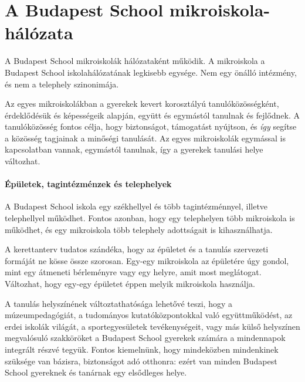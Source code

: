 \section{A Budapest School mikroiskola-hálózata}


A Budapest School mikroiskolák hálózataként működik. A mikroiskola a Budapest
School iskolahálózatának legkisebb egysége. Nem egy önálló intézmény, és nem a
telephely szinonimája.

Az egyes mikroiskolákban a gyerekek kevert korosztályú tanulóközösségként,
érdeklődésük és képességeik alapján, együtt és egymástól tanulnak és fejlődnek.
A tanulóközösség fontos célja, hogy biztonságot, támogatást nyújtson, és
\emph{így} segítse a közösség tagjainak a minőségi tanulását. Az egyes
mikroiskolák egymással is kapcsolatban vannak,
egymástól tanulnak, így a gyerekek tanulási helye változhat.

\paragraph{Épületek, tagintézménzek és telephelyek}
A Budapest School iskola egy székhellyel és több tagintézménnyel, illetve
telephellyel működhet. Fontos azonban, hogy egy telephelyen több mikroiskola is
működhet, és egy mikroiskola több telephely adottságait is kihasználhatja.

A kerettanterv tudatos szándéka, hogy az épületet és a
tanulás szervezeti formáját ne kösse össze szorosan. Egy-egy mikroiskola az
épületére úgy gondol, mint egy átmeneti bérleményre vagy egy helyre, amit most
meglátogat.
Változhat, hogy egy-egy épületet éppen melyik mikroiskola használja.

A tanulás helyszínének változtathatósága lehetővé teszi, hogy a
múzeumpedagógiát, a tudományos kutatóközpontokkal való együttműködést, az erdei
iskolák világát, a sportegyesületek tevékenységeit, vagy más külső helyszínen
megvalósuló szakköröket a Budapest School gyerekek számára a mindennapok
integrált részvé tegyük. Fontos kiemelnünk, hogy mindeközben mindenkinek
szüksége van bázisra, biztonságot adó otthonra: ezért van minden Budapest
School gyereknek és tanárnak egy elsődleges helye.
\ifkerettanterv
